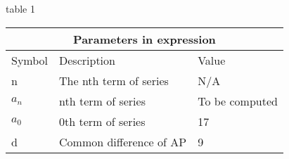 \setlength{\arrayrulewidth}{0.3mm}
\setlength{\tabcolsep}{15pt}
\renewcommand{\arraystretch}{1.5}

table 1\\

\begin{tabular}{ |p{1cm}|p{3cm}|p{1cm}| }
\hline
\multicolumn{3}{|c|}{Parameters in expression}\\
\hline
Symbol & Description & Value\\
\hline
n & The nth term of series & N/A\\
\hline
$a_n$ & nth term of series & To be computed\\
\hline
$a_0$ & 0th term of series & 17 \\
\hline
d & Common difference of AP & 9\\
\hline
\end{tabular}
